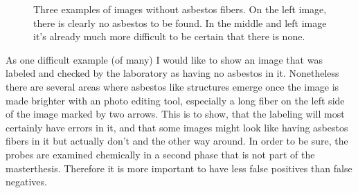 \begin{figure}[h]
\centering
{}

\caption{Three examples of images without asbestos fibers. On the left image, there is clearly no asbestos to be found. In the middle and left image it's already much more difficult to be certain that there is none.}
\label{fig:non-asbestos_examples}
\end{figure}

As one difficult example (of many) I would like to show an image that was labeled and checked by the laboratory as having no asbestos in it. Nonetheless there are several areas where asbestos like structures emerge once the image is made brighter with an photo editing tool, especially a long fiber on the left side of the image marked by two arrows. This is to show, that the labeling will most certainly have errors in it, and that some images might look like having asbestos fibers in it but actually don't and the other way around. In order to be sure, the probes are examined chemically in a second phase that is not part of the masterthesis. Therefore it is more important to have less false positives than false negatives.

